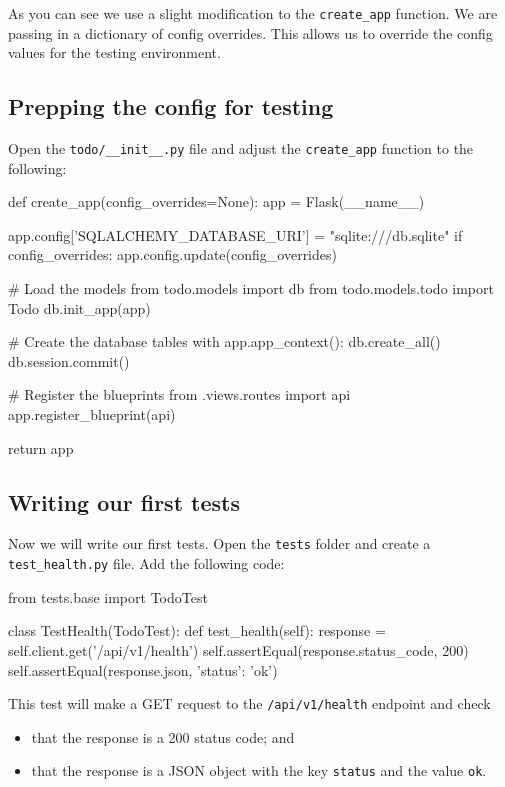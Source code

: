 \documentclass{csse4400}
\begin{document}
As you can see we use a slight modification to the \texttt{create\_app} function.
We are passing in a dictionary of config overrides.
This allows us to override the config values for the testing environment.

\subsection{Prepping the config for testing}

Open the \texttt{todo/\_\_init\_\_.py} file and adjust the \texttt{create\_app} function to the following:

\begin{code}[language=python,numbers=none]{}
  def create_app(config_overrides=None):
      app = Flask(__name__)
  
      app.config['SQLALCHEMY_DATABASE_URI'] = "sqlite:///db.sqlite"
      if config_overrides:
          app.config.update(config_overrides)
          
      # Load the models
      from todo.models import db
      from todo.models.todo import Todo
      db.init_app(app)
  
      # Create the database tables
      with app.app_context():
          db.create_all()
          db.session.commit()
  
      # Register the blueprints
      from .views.routes import api
      app.register_blueprint(api)
  
      return app
\end{code}

\subsection{Writing our first tests}

Now we will write our first tests.
Open the \texttt{tests} folder and create a \texttt{test\_health.py} file.
Add the following code:

\begin{code}[language=python,numbers=none]{}
  from tests.base import TodoTest
  
  
  class TestHealth(TodoTest):
      def test_health(self):
          response = self.client.get('/api/v1/health')
          self.assertEqual(response.status_code, 200)
          self.assertEqual(response.json, {'status': 'ok'})

\end{code}

This test will make a GET request to the \texttt{/api/v1/health} endpoint and check 
\begin{itemize}
  \item that the response is a 200 status code; and
  \item that the response is a JSON object with the key \texttt{status} and the value \texttt{ok}.
\end{itemize}
\end{document}
